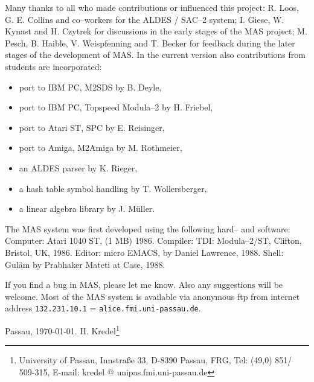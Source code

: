 Many thanks to all who made contributions or influenced this project:
R. Loos, G. E. Collins and co--workers for the 
ALDES / SAC--2 system;
I. Giese, W. Kynast and H. Czytrek for discussions in the
early stages of the MAS project;
M. Pesch, B. Haible,
V. Weispfenning and T. Becker  
for feedback during 
the later stages of the development of MAS. 
In the current version also contributions from students 
are incorporated:
\begin{itemize}
\item port to IBM PC, M2SDS by B. Deyle, 
\item port to IBM PC, Topspeed Modula--2 by H. Friebel, 
\item port to Atari ST, SPC by E. Reisinger, 
\item port to Amiga, M2Amiga by M. Rothmeier, 
\item an ALDES parser by K. Rieger, 
\item a hash table symbol handling by T. Wollersberger,
\item a linear algebra library by J. M\"uller. 
\end{itemize}

The MAS system was first developed using the 
following hard-- and software: 
Computer: Atari 1040 ST, (1 MB) 1986.  
Compiler: TDI: Modula--2/ST, Clifton, Bristol, UK, 1986.  
Editor: micro EMACS, by Daniel Lawrence, 1988.  
Shell: Gul\"am by Prabhaker Mateti at Case, 1988.  

If you find a bug in MAS, please let me know. 
Also any suggestions will be welcome. 
Most of the MAS system is available via anonymous ftp 
from internet address \verb/132.231.10.1/ = 
\verb/alice.fmi.uni-passau.de/.

\begin{center}
Passau, \today. \hfill H. Kredel\footnote{University of Passau, 
                                 Innstra\ss e 33, D-8390 Passau, FRG,
                                 Tel: (49,0) 851/ 509-315,
                                 E-mail: kredel @ 
                                 unipas.fmi.uni-passau.de}
\end{center}

